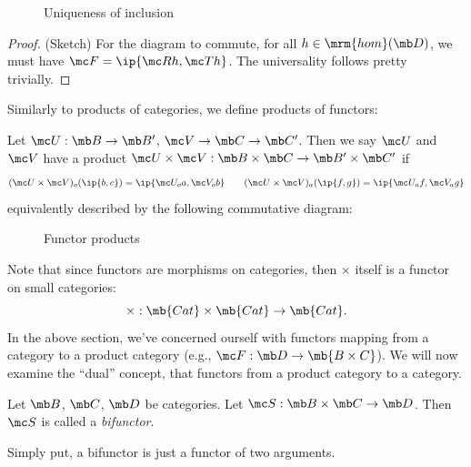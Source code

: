 \documentclass{fkbook}
\newcommand{\homm}{\mrm{hom}}
\begin{document}
\begin{adjustwidth}{1em}{1em}
\begin{theorem}
\begin{figure}[H]
      \caption{Uniqueness of inclusion}
    \end{figure}
  \end{theorem}
  \begin{proof} (Sketch) For the diagram to commute, for all $h \in
    \homm(\mb D)$, we must have $\mc F = \ip{\mc R h, \mc T h}$. The
    universality follows pretty trivially.
  \end{proof}
  Similarly to products of categories, we define products of functors:
  \begin{definition}
    Let $\mc U : \mb B \to \mb B'$, $\mc V \to \mb C \to \mb C'$. Then
    we say $\mc U$ and $\mc V$ have a product $\mc U \times \mc V :
    \mb B \times \mb C \to \mb B' \times \mb C'$ if
    \[
      (\mc U \times \mc V)_o(\ip{b,c}) = \ip{\mc U_o a, \mc V_o b} \qquad
      (\mc U \times \mc V)_a(\ip{f,g}) = \ip{\mc U_a f, \mc V_a g}
    \]
    equivalently described by the following commutative diagram:
    \begin{figure}[H]
      \centering
      \caption{Functor products}
    \end{figure}
  \end{definition}
  Note that since functors are morphisms on categories, then $\times$
  itself is a functor on small categories:
  \[
    \times : \mb{Cat} \times \mb{Cat} \to \mb{Cat}.
  \]
  In the above section, we've concerned ourself with functors mapping
  from a category to a product category (e.g., $\mc F : \mb D \to
  \mb{B \times C}$). We will now examine the ``dual'' concept, that
  functors from a product category to a category.
  \begin{definition}[Bifunctor]
    Let $\mb B$, $\mb C$, $\mb D$ be categories. Let $\mc S : \mb B
    \times \mb C \to \mb D$. Then $\mc S$ is called a
    \emph{bifunctor}.
  \end{definition}
  Simply put, a bifunctor is just a functor of two arguments.


\end{adjustwidth}
\end{document}
